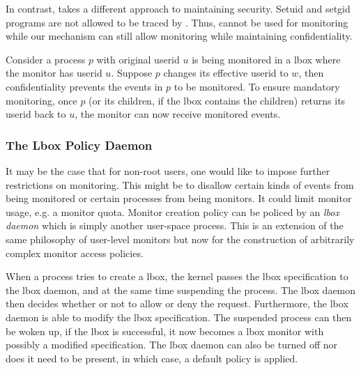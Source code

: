 In contrast,  takes a different approach to maintaining
security.
Setuid and setgid programs are not allowed to be traced by .
Thus,  cannot be used for monitoring while our mechanism can
still allow monitoring while maintaining confidentiality.

Consider a process $p$ with original userid $u$ is being monitored in a lbox
where the monitor has userid $u$.
Suppose $p$ changes its effective userid to $w$, then confidentiality
prevents the events in $p$ to be monitored.
To ensure mandatory monitoring, once $p$ (or its children, if the
lbox contains the children) returns its userid back to $u$, the monitor
can now receive monitored events.

\subsubsection{The Lbox Policy Daemon}

It may be the case that for non-root users, one would like to impose
further restrictions on monitoring. This might be to disallow certain
kinds of events from being monitored or certain processes from being monitors.
It could limit monitor usage, e.g. a monitor quota.
Monitor creation policy can be policed by an {\em lbox daemon}
which is simply another user-space process.
This is an extension of the same philosophy of user-level monitors but
now for the construction of
arbitrarily complex monitor access policies.

When a process tries to create a lbox, the kernel passes the lbox
specification to the lbox daemon, and at the same time suspending the process.
The lbox daemon then decides whether or not to allow or deny the request.
Furthermore, the lbox daemon is able to modify the lbox specification.
The suspended process can then be woken up, if the lbox is successful,
it now becomes a lbox monitor with possibly a modified specification.
The lbox daemon can also be turned off nor does it need to be present, 
in which case, a default policy is applied.

